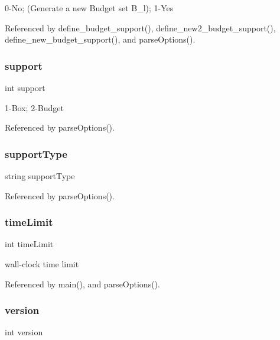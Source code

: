 0-\/\+No; (Generate a new Budget set B\+\_\+l); 1-\/\+Yes 



Referenced by define\+\_\+budget\+\_\+support(), define\+\_\+new2\+\_\+budget\+\_\+support(), define\+\_\+new\+\_\+budget\+\_\+support(), and parse\+Options().

\mbox{\label{options_8cpp_ae8470b9dfef111e0d72a983ce72e4c9c}} 
\subsubsection{support}
{\footnotesize\ttfamily int support}



1-\/\+Box; 2-\/\+Budget 



Referenced by parse\+Options().

\mbox{\label{options_8cpp_a3853824cedf4d86c04beb83f79c09c92}} 
\subsubsection{support\+Type}
{\footnotesize\ttfamily string support\+Type}



Referenced by parse\+Options().

\mbox{\label{options_8cpp_a4c4841c2a2303b528024625ed83c3b4f}} 
\subsubsection{time\+Limit}
{\footnotesize\ttfamily int time\+Limit}



wall-\/clock time limit 



Referenced by main(), and parse\+Options().

\mbox{\label{options_8cpp_aad880fc4455c253781e8968f2239d56f}} 
\subsubsection{version}
{\footnotesize\ttfamily int version}



